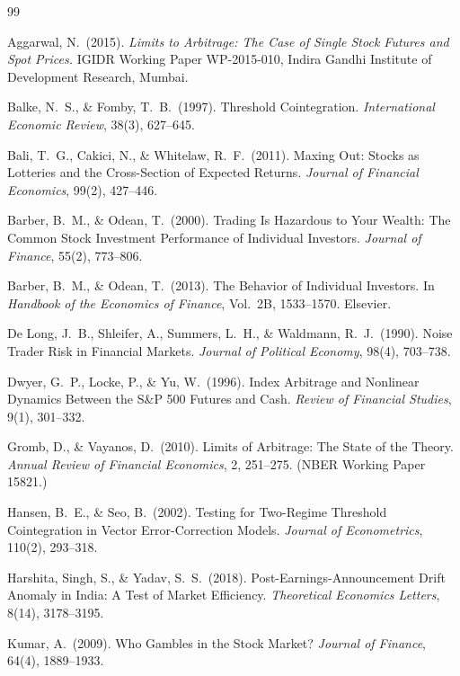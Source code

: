\newpage
{}
{}
\begin{thebibliography}{99}
\setlength{\itemsep}{2pt}

 Aggarwal, N.\ (2015). \emph{Limits to Arbitrage: The Case of Single Stock Futures and Spot Prices.} IGIDR Working Paper WP-2015-010, Indira Gandhi Institute of Development Research, Mumbai.

 Balke, N.\ S., \& Fomby, T.\ B.\ (1997). Threshold Cointegration. \emph{International Economic Review}, 38(3), 627--645.

 Bali, T.\ G., Cakici, N., \& Whitelaw, R.\ F.\ (2011). Maxing Out: Stocks as Lotteries and the Cross-Section of Expected Returns. \emph{Journal of Financial Economics}, 99(2), 427--446.

 Barber, B.\ M., \& Odean, T.\ (2000). Trading Is Hazardous to Your Wealth: The Common Stock Investment Performance of Individual Investors. \emph{Journal of Finance}, 55(2), 773--806.

 Barber, B.\ M., \& Odean, T.\ (2013). The Behavior of Individual Investors. In \emph{Handbook of the Economics of Finance}, Vol.\ 2B, 1533--1570. Elsevier.

 De Long, J.\ B., Shleifer, A., Summers, L.\ H., \& Waldmann, R.\ J.\ (1990). Noise Trader Risk in Financial Markets. \emph{Journal of Political Economy}, 98(4), 703--738.

 Dwyer, G.\ P., Locke, P., \& Yu, W.\ (1996). Index Arbitrage and Nonlinear Dynamics Between the S\&P 500 Futures and Cash. \emph{Review of Financial Studies}, 9(1), 301--332.

 Gromb, D., \& Vayanos, D.\ (2010). Limits of Arbitrage: The State of the Theory. \emph{Annual Review of Financial Economics}, 2, 251--275. (NBER Working Paper 15821.)

 Hansen, B.\ E., \& Seo, B.\ (2002). Testing for Two-Regime Threshold Cointegration in Vector Error-Correction Models. \emph{Journal of Econometrics}, 110(2), 293--318.

 Harshita, Singh, S., \& Yadav, S.\ S.\ (2018). Post-Earnings-Announcement Drift Anomaly in India: A Test of Market Efficiency. \emph{Theoretical Economics Letters}, 8(14), 3178--3195.

 Kumar, A.\ (2009). Who Gambles in the Stock Market? \emph{Journal of Finance}, 64(4), 1889--1933.


\end{thebibliography}
